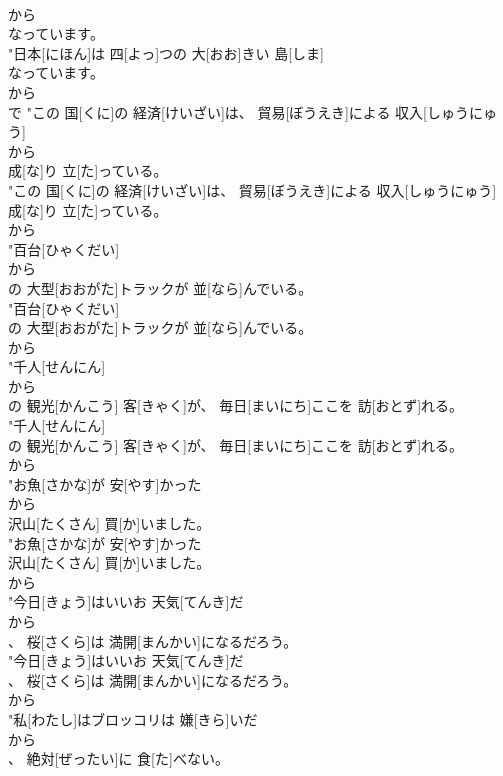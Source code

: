 \documentclass[8pt]{extreport}
\begin{document}
\begin{CJK}{UTF8}{min}
\\	から
\\	なっています。
\\	"日本[にほん]は 四[よっ]つの 大[おお]きい 島[しま]
\\	なっています。
\\	から
\\	で	"この 国[くに]の 経済[けいざい]は、 貿易[ぼうえき]による 収入[しゅうにゅう]
\\	から
\\	成[な]り 立[た]っている。
\\	"この 国[くに]の 経済[けいざい]は、 貿易[ぼうえき]による 収入[しゅうにゅう]
\\	成[な]り 立[た]っている。
\\	から
\\	"百台[ひゃくだい]
\\	から
\\	の 大型[おおがた]トラックが 並[なら]んでいる。
\\	"百台[ひゃくだい]
\\	の 大型[おおがた]トラックが 並[なら]んでいる。
\\	から
\\	"千人[せんにん]
\\	から
\\	の 観光[かんこう] 客[きゃく]が、 毎日[まいにち]ここを 訪[おとず]れる。
\\	"千人[せんにん]
\\	の 観光[かんこう] 客[きゃく]が、 毎日[まいにち]ここを 訪[おとず]れる。
\\	から
\\	"お魚[さかな]が 安[やす]かった
\\	から
\\	沢山[たくさん] 買[か]いました。
\\	"お魚[さかな]が 安[やす]かった
\\	沢山[たくさん] 買[か]いました。
\\	から
\\	"今日[きょう]はいいお 天気[てんき]だ
\\	から
\\	、 桜[さくら]は 満開[まんかい]になるだろう。
\\	"今日[きょう]はいいお 天気[てんき]だ
\\	、 桜[さくら]は 満開[まんかい]になるだろう。
\\	から
\\	"私[わたし]はブロッコリは 嫌[きら]いだ
\\	から
\\	、 絶対[ぜったい]に 食[た]べない。

\end{CJK}
\end{document}
